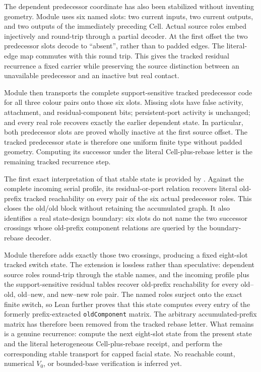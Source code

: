 \documentclass[11pt]{article}
\theoremstyle{definition}
\begin{document}
The dependent predecessor coordinate has also been stabilized without
inventing geometry.  Module
uses six named slots: two current inputs, two current outputs, and two outputs
of the immediately preceding Cell.  Actual source roles embed injectively and
round-trip through a partial decoder.  At the first offset the two predecessor
slots decode to “absent”, rather than to padded edges.  The literal-edge map
commutes with this round trip.  This gives the tracked residual recurrence a
fixed carrier while preserving the source distinction between an unavailable
predecessor and an inactive but real contact.

Module
then transports the complete support-sensitive tracked predecessor code for
all three colour pairs onto those six slots.  Missing slots have false
activity, attachment, and residual-component bits; persistent-port activity
is unchanged; and every real role recovers exactly the earlier dependent
state.  In particular, both predecessor slots are proved wholly inactive at
the first source offset.  The tracked predecessor state is therefore one
uniform finite type without padded geometry.  Computing its successor under
the literal Cell-plus-rebase letter is the remaining tracked recurrence step.

The first exact interpretation of that stable state is provided by
.
Against the complete incoming serial profile, its residual-or-port relation
recovers literal old-prefix tracked reachability on every pair of the six
actual predecessor roles.  This closes the old/old block without retaining
the accumulated graph.  It also identifies a real state-design boundary: six
slots do not name the two successor crossings whose old-prefix component
relations are queried by the boundary-rebase decoder.

Module
therefore adds exactly those two crossings, producing a fixed eight-slot
tracked switch state.  The extension is lossless rather than speculative:
dependent source roles round-trip through the stable names, and the incoming
profile plus the support-sensitive residual tables recover old-prefix
reachability for every old--old, old--new, and new--new role pair.  The named
roles surject onto the exact finite switch, so Lean further proves that this
state computes every entry of the formerly prefix-extracted
\texttt{oldComponent} matrix.  The arbitrary accumulated-prefix matrix has
therefore been removed from the tracked rebase letter.  What remains is a
genuine recurrence: compute the next eight-slot state from the present state
and the literal heterogeneous Cell-plus-rebase receipt, and perform the
corresponding stable transport for capped facial state.  No reachable count,
numerical $V_0$, or bounded-base verification is inferred yet.
\end{document}
